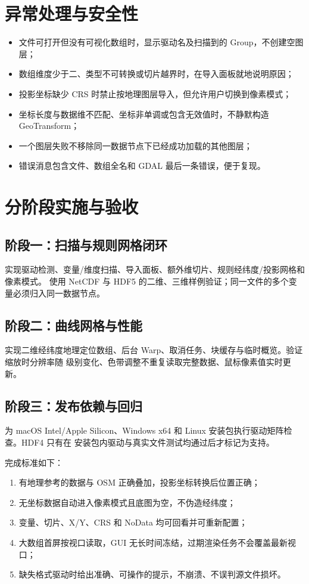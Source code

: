 \documentclass[UTF8,fontset=fandol,11pt]{ctexart}
\begin{document}
\section{异常处理与安全性}

\begin{itemize}
  \item 文件可打开但没有可视化数组时，显示驱动名及扫描到的 Group，不创建空图层；
  \item 数组维度少于二、类型不可转换或切片越界时，在导入面板就地说明原因；
  \item 投影坐标缺少 CRS 时禁止按地理图层导入，但允许用户切换到像素模式；
  \item 坐标长度与数据维不匹配、坐标非单调或包含无效值时，不静默构造 GeoTransform；
  \item 一个图层失败不移除同一数据节点下已经成功加载的其他图层；
  \item 错误消息包含文件、数组全名和 GDAL 最后一条错误，便于复现。
\end{itemize}

\section{分阶段实施与验收}

\subsection*{阶段一：扫描与规则网格闭环}
实现驱动检测、变量/维度扫描、导入面板、额外维切片、规则经纬度/投影网格和像素模式。
使用 NetCDF 与 HDF5 的二维、三维样例验证；同一文件的多个变量必须归入同一数据节点。

\subsection*{阶段二：曲线网格与性能}
实现二维经纬度地理定位数组、后台 Warp、取消任务、块缓存与临时概览。验证缩放时分辨率随
级别变化、色带调整不重复读取完整数据、鼠标像素值实时更新。

\subsection*{阶段三：发布依赖与回归}
为 macOS Intel/Apple Silicon、Windows x64 和 Linux 安装包执行驱动矩阵检查。HDF4 只有在
安装包内驱动与真实文件测试均通过后才标记为支持。

完成标准如下：
\begin{enumerate}
  \item 有地理参考的数据与 OSM 正确叠加，投影坐标转换后位置正确；
  \item 无坐标数据自动进入像素模式且底图为空，不伪造经纬度；
  \item 变量、切片、X/Y、CRS 和 NoData 均可回看并可重新配置；
  \item 大数组首屏按视口读取，GUI 无长时间冻结，过期渲染任务不会覆盖最新视口；
  \item 缺失格式驱动时给出准确、可操作的提示，不崩溃、不误判源文件损坏。
\end{enumerate}
\end{document}
